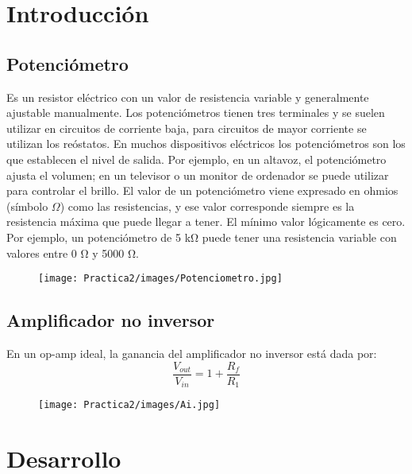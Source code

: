 \documentclass[12pt]{article}
\begin{document}
	\tableofcontents
	\newpage
	
	\section{Introducción}
	    \subsection{Potenciómetro}
    	Es un resistor eléctrico con un valor de resistencia variable y generalmente ajustable manualmente. Los potenciómetros tienen tres terminales y se suelen utilizar en circuitos de corriente baja, para circuitos de mayor corriente se utilizan los reóstatos. En muchos dispositivos eléctricos los potenciómetros son los que establecen el nivel de salida. Por ejemplo, en un altavoz, el potenciómetro ajusta el volumen; en un televisor o un monitor de ordenador se puede utilizar para controlar el brillo.
    	El valor de un potenciómetro viene expresado en ohmios (símbolo $\Omega$) como las resistencias, y ese valor corresponde siempre es la resistencia máxima que puede llegar a tener. El mínimo valor lógicamente es cero. Por ejemplo, un potenciómetro de 5 kΩ puede tener una resistencia variable con valores entre 0 Ω y 5000 Ω.
    	\begin{figure}[h!]
                \centering
                \texttt{[image: Practica2/images/Potenciometro.jpg]}
            \end{figure}
        \subsection{Amplificador no inversor}
        En un op-amp ideal, la ganancia del amplificador no inversor está dada por:
        $$
            \frac{V_{out}}{V_{in}}=1+\frac{R_{f}}{R_{1}}
        $$
        \begin{figure}[h!]
                \centering
                \texttt{[image: Practica2/images/Ai.jpg]}
            \end{figure}

    
	\newpage
	\section{Desarrollo}
\end{document}
